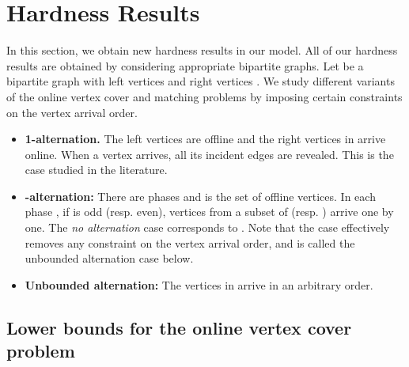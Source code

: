 \documentclass{article}
\begin{document}
\section{Hardness Results}

In this section, we obtain new hardness results in our model. All of our hardness results are obtained by considering appropriate bipartite graphs.
Let  be a bipartite graph with left vertices  and right vertices . We study different variants of the online vertex cover and matching problems by imposing certain constraints on the vertex arrival order.

\begin{itemize}
\item {\bf 1-alternation.} The left vertices  are offline and the right vertices in  arrive online. When a vertex  arrives, all its incident edges are revealed. This is the case studied in the literature.
\item {\bf -alternation:}  There are  phases and  is the set of offline vertices. In each phase , if  is odd (resp. even), vertices from a subset of  (resp. ) arrive one by one. 
The {\em no alternation} case corresponds to .
Note that the case  effectively removes any constraint on the vertex arrival order, and is called the unbounded alternation case below.
\item {\bf Unbounded alternation:} The vertices in  arrive in an arbitrary order.
\end{itemize}

\subsection{Lower bounds for the online vertex cover problem}
\end{document}
